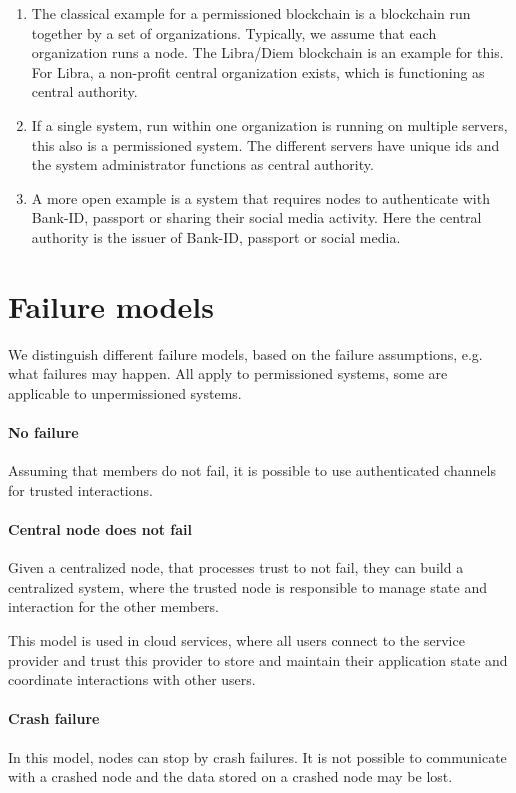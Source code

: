 \begin{example}
	\begin{enumerate}
		\item The classical example for a permissioned blockchain is a blockchain run together by a set of organizations. Typically, we assume that each organization runs a node. The Libra/Diem blockchain is an example for this. For Libra, a non-profit central organization exists, which is functioning as central authority.
		\item If a single system, run within one organization is running on multiple servers, this also is a permissioned system. The different servers have unique ids and the system administrator functions as central authority.
		\item A more open example is a system that requires nodes to authenticate with Bank-ID, passport or sharing their social media activity. 
		Here the central authority is the issuer of Bank-ID, passport or social media.
	\end{enumerate}
\end{example}


\section{Failure models}
We distinguish different failure models, based on the failure assumptions, e.g. what failures may happen.
All apply to permissioned systems, some are applicable to unpermissioned systems.

\paragraph{No failure}
Assuming that members do not fail, it is possible to use authenticated channels for trusted interactions.

\paragraph{Central node does not fail}
Given a centralized node, that processes trust to not fail, they can build a centralized system, where the trusted node is responsible to manage state and interaction for the other members.

This model is used in cloud services, where all users connect to the service provider and trust this provider to store and maintain their application state and coordinate interactions with other users.

\paragraph{Crash failure}
In this model, nodes can stop by crash failures. It is not possible to communicate with a crashed node and the data stored on a crashed node may be lost.


